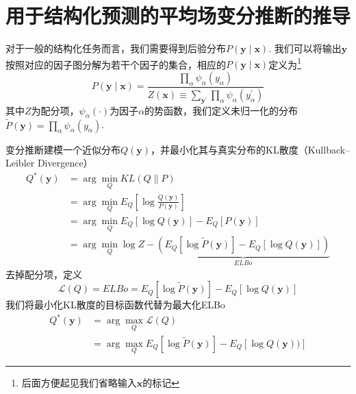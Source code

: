 \chapter{用于结构化预测的平均场变分推断的推导}
\label{appendix:mfvi-derivation}
对于一般的结构化任务而言，我们需要得到后验分布$P(\boldsymbol{y}\mid\boldsymbol{x})$.
我们可以将输出$\boldsymbol{y}$按照对应的因子图分解为若干个因子的集合\citep{sutton-etal-2012-crf}，相应的$P(\boldsymbol{y}\mid\boldsymbol{x})$定义为\footnote{后面方便起见我们省略输入$\boldsymbol{x}$的标记}
\begin{equation}\label{eq:posterior}
  P(\boldsymbol{y}\mid\boldsymbol{x}) =\frac{\prod_{\alpha} \psi_{\alpha}(y_{\alpha})}{Z(\boldsymbol{x})\equiv\sum_{\boldsymbol{y}^{\prime}}\prod_{\alpha} \psi_{\alpha}(y^{\prime}_{\alpha})}
\end{equation}
其中$Z$为配分项，$\psi_{\alpha}(\cdot)$为因子$\alpha$的势函数，我们定义未归一化的分布$\tilde{P}(\boldsymbol{y})=\prod_{\alpha} \psi_{\alpha}(y_{\alpha})$.

变分推断建模一个近似分布$Q(\boldsymbol{y})$，并最小化其与真实分布的KL散度（Kullback–Leibler Divergence）
\begin{equation}
  \begin{split}
    Q^{\ast}(\boldsymbol{y})
    &=\arg\min_{Q} KL(Q\|P)\\
    &=\arg\min_{Q} E_{Q}\left[\log\frac{Q(\boldsymbol{y})}{P(\boldsymbol{y})}\right]\\
    &=\arg\min_{Q} E_{Q}\left[\log Q(\boldsymbol{y})\right] - E_{Q}\left[P(\boldsymbol{y})\right]\\
    &=\arg\min_{Q} \log Z-\underbrace{\left(E_{Q}\left[\log \tilde{P}(\boldsymbol{y})\right]-E_{Q}\left[\log Q(\boldsymbol{y})\right]\right)}_{ELBo}
  \end{split}
\end{equation}
去掉配分项，定义
\begin{equation}
  \mathcal{L}(Q)=ELBo=E_{Q}\left[\log \tilde{P}(\boldsymbol{y})\right]-E_{Q}\left[\log Q(\boldsymbol{y})\right]
\end{equation}
我们将最小化KL散度的目标函数代替为最大化ELBo
\begin{equation}
  \begin{split}
    Q^{\ast}(\boldsymbol{y}) &= \arg\max_{Q}\mathcal{L}(Q)\\
    &= \arg\max_{Q}E_{Q}\left[\log \tilde{P}(\boldsymbol{y})\right]-E_{Q}\left[\log Q(\boldsymbol{y}))\right]
  \end{split}
\end{equation}


